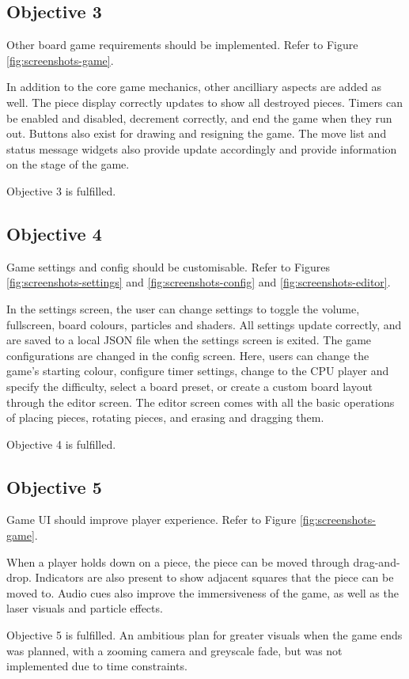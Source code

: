 \documentclass[../main/main.tex]{subfiles}
\begin{document}
\subsection{Objective 3}
Other board game requirements should be implemented. Refer to Figure \ref{fig:screenshots-game}.

In addition to the core game mechanics, other ancilliary aspects are added as well. The piece display correctly updates to show all destroyed pieces. Timers can be enabled and disabled, decrement correctly, and end the game when they run out. Buttons also exist for drawing and resigning the game. The move list and status message widgets also provide update accordingly and provide information on the stage of the game.

Objective 3 is fulfilled.

\subsection{Objective 4}
Game settings and config should be customisable. Refer to Figures \ref{fig:screenshots-settings} and \ref{fig:screenshots-config} and \ref{fig:screenshots-editor}.

In the settings screen, the user can change settings to toggle the volume, fullscreen, board colours, particles and shaders. All settings update correctly, and are saved to a local JSON file when the settings screen is exited. The game configurations are changed in the config screen. Here, users can change the game's starting colour, configure timer settings, change to the CPU player and specify the difficulty, select a board preset, or create a custom board layout through the editor screen. The editor screen comes with all the basic operations of placing pieces, rotating pieces, and erasing and dragging them.

Objective 4 is fulfilled.

\subsection{Objective 5}
Game UI should improve player experience. Refer to Figure \ref{fig:screenshots-game}.

When a player holds down on a piece, the piece can be moved through drag-and-drop. Indicators are also present to show adjacent squares that the piece can be moved to. Audio cues also improve the immersiveness of the game, as well as the laser visuals and particle effects.

Objective 5 is fulfilled. An ambitious plan for greater visuals when the game ends was planned, with a zooming camera and greyscale fade, but was not implemented due to time constraints.
\end{document}
